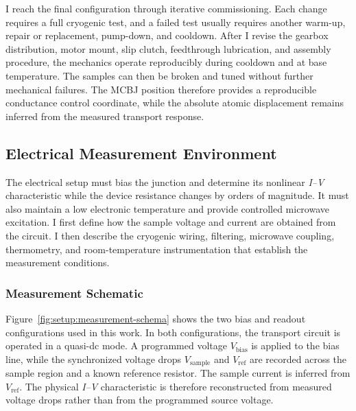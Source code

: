             I reach the final configuration through iterative commissioning. Each change requires a full cryogenic test, and a failed test usually requires another warm-up, repair or replacement, pump-down, and cooldown. After I revise the gearbox distribution, motor mount, slip clutch, feedthrough lubrication, and assembly procedure, the mechanics operate reproducibly during cooldown and at base temperature. The samples can then be broken and tuned without further mechanical failures. The MCBJ position therefore provides a reproducible conductance control coordinate, while the absolute atomic displacement remains inferred from the measured transport response.

    \subsection{Electrical Measurement Environment}
    \label{subsec:setup:electrical}

        The electrical setup must bias the junction and determine its nonlinear \textit{I--V} characteristic while the device resistance changes by orders of magnitude. It must also maintain a low electronic temperature and provide controlled microwave excitation. I first define how the sample voltage and current are obtained from the circuit. I then describe the cryogenic wiring, filtering, microwave coupling, thermometry, and room-temperature instrumentation that establish the measurement conditions.

        \subsubsection*{Measurement Schematic}

            Figure~\ref{fig:setup:measurement-schema} shows the two bias and readout configurations used in this work. In both configurations, the transport circuit is operated in a quasi-dc mode. A programmed voltage $V_\mathrm{bias}$ is applied to the bias line, while the synchronized voltage drops $V_\mathrm{sample}$ and $V_\mathrm{ref}$ are recorded across the sample region and a known reference resistor. The sample current is inferred from $V_\mathrm{ref}$. The physical \textit{I--V} characteristic is therefore reconstructed from measured voltage drops rather than from the programmed source voltage.

